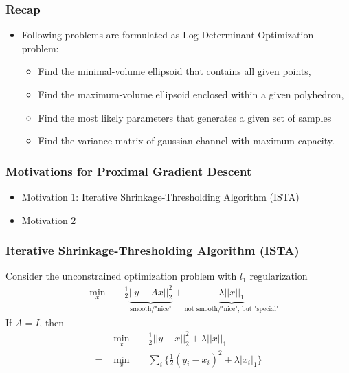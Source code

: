 \documentclass{beamer}
\begin{document}
\begin{frame}
\frametitle{Recap}
\begin{itemize}
\item Following problems are formulated as Log Determinant Optimization
problem:
\begin{itemize}
    \item Find the minimal-volume ellipsoid that contains all given points, 
    \item Find the maximum-volume ellipsoid enclosed within a given polyhedron, 
    \item Find the most likely parameters that generates a given set of samples
    \item Find the variance matrix of gaussian channel with maximum capacity.
\end{itemize}
\end{itemize}

\end{frame}

\begin{frame}
\frametitle{Motivations for Proximal Gradient Descent}
\begin{itemize}
    \item Motivation 1: Iterative Shrinkage-Thresholding Algorithm (ISTA)
    \item Motivation 2
\end{itemize}
\end{frame}

\begin{frame}
\frametitle{Iterative Shrinkage-Thresholding Algorithm (ISTA)}
Consider the unconstrained optimization problem with $l_1$ regularization
\begin{equation}
\begin{aligned}
    & \underset{x}{\text{ min }}
    && \frac{1}{2}\underbrace{|| y - Ax ||_2^2}_{\text{smooth/"nice"}}
    + \underbrace{  \lambda || x ||_1 }_{\text{not smooth/"nice", but "special"}}
\end{aligned}
\end{equation}
If $A = I$, then
\begin{equation}
\begin{aligned}
    & \underset{x}{\text{ min }} 
    && \frac{1}{2} || y - x ||_2^2 + \lambda || x ||_1 \\
    = 
    & \underset{x}{\text{ min }} 
    && \sum_i \{ \frac{1}{2} ( y_i - x_i )^2  + \lambda | x_i |_1 \} \\
\end{aligned}
\end{equation}
\end{frame}
\end{document}
